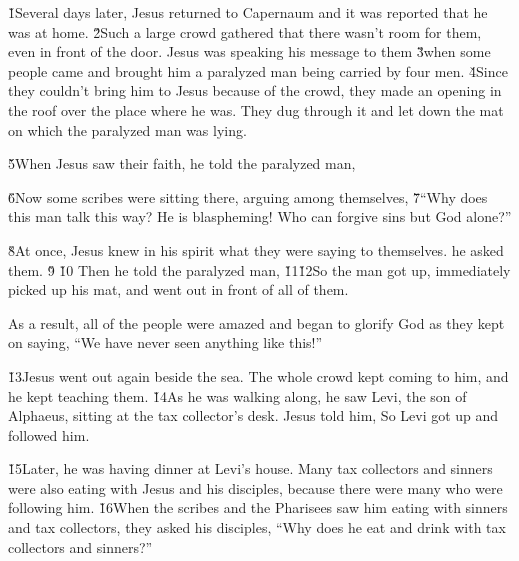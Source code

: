\v{1}Several days later, Jesus returned to Capernaum and it was reported that he was at home. \v{2}Such a large crowd gathered that there wasn't room for them, even in front of the door. Jesus was speaking his message to them \v{3}when some people came and brought him a paralyzed man being carried by four men. \v{4}Since they couldn't bring him to Jesus because of the crowd, they made an opening in the roof over the place where he was. They dug through it and let down the mat on which the paralyzed man was lying.

\v{5}When Jesus saw their faith, he told the paralyzed man, 

\v{6}Now some scribes were sitting there, arguing among themselves, \v{7}``Why does this man talk this way? He is blaspheming! Who can forgive sins but God alone?''

\v{8}At once, Jesus knew in his spirit what they were saying to themselves.  he asked them. \v{9} \v{10} Then he told the paralyzed man, \v{11}\v{12}So the man got up, immediately picked up his mat, and went out in front of all of them.

As a result, all of the people were amazed and began to glorify God as they kept on saying, ``We have never seen anything like this!''

\v{13}Jesus went out again beside the sea. The whole crowd kept coming to him, and he kept teaching them. \v{14}As he was walking along, he saw Levi, the son of Alphaeus, sitting at the tax collector's desk. Jesus told him,  So Levi got up and followed him.

\v{15}Later, he was having dinner at Levi's house. Many tax collectors and sinners were also eating with Jesus and his disciples, because there were many who were following him. \v{16}When the scribes and the Pharisees saw him eating with sinners and tax collectors, they asked his disciples, ``Why does he eat and drink with tax collectors and sinners?''

